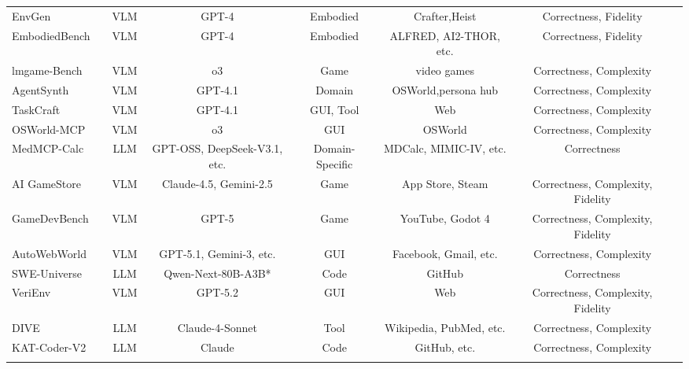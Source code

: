 \documentclass{llmxive}
\providecommand{\Text}{
  \begin{tikzpicture}[baseline=(char.base)]
    \fill[textgreen!50] (0,0) circle (0.18);
    \node[white, font=\scriptsize\rmfamily, inner sep=0pt] (char) at (0,0) {T};
  \end{tikzpicture}
}
\providecommand{\Image}{
  \begin{tikzpicture}[baseline=(char.base)]
    \fill[textred!50] (0,0) circle (0.18);
    \node[white, font=\scriptsize\rmfamily, inner sep=0pt] (char) at (0,0) {I};
  \end{tikzpicture}
}
\providecommand{\Video}{
  \begin{tikzpicture}[baseline=(char.base)]
    \fill[textyellow!50] (0,0) circle (0.18);
    \node[white, font=\scriptsize\rmfamily, inner sep=0pt] (char) at (0,0) {V};
  \end{tikzpicture}
}
\begin{document}
\begin{table}[htbp]
{\begin{tabular}{lccccccc}
 EnvGen\cite{EnvGen} & \Text\hspace{-0.4em}\Image & VLM & GPT-4 & Embodied & Crafter,Heist & Correctness, Fidelity \\
 EmbodiedBench\cite{EmbodiedBench} & \Text\hspace{-0.4em}\Image & VLM & GPT-4 & Embodied & ALFRED, AI2-THOR, etc. & Correctness, Fidelity \\
 lmgame-Bench\cite{LMGAME-BENCH} & \Text\hspace{-0.4em}\Image & VLM & o3 & Game & video games & Correctness, Complexity \\
 AgentSynth\cite{AgentSynth} &\Text\hspace{-0.4em}\Image & VLM & GPT-4.1 & Domain & OSWorld,persona hub & Correctness, Complexity \\
 TaskCraft\cite{TaskCraft} & \Text\hspace{-0.4em}\Image & VLM & GPT-4.1 & GUI, Tool & Web & Correctness, Complexity \\
 OSWorld-MCP\cite{OSWorld-MCP} & \Text\hspace{-0.4em}\Image & VLM & o3 & GUI & OSWorld & Correctness, Complexity \\
 MedMCP-Calc\cite{MedMCP-Calc} & \Text & LLM & GPT-OSS, DeepSeek-V3.1, etc. & Domain-Specific & MDCalc, MIMIC-IV, etc. & Correctness \\
 AI GameStore\cite{AI_GAMESTORE} & \Text\hspace{-0.4em}\Image & VLM & Claude-4.5, Gemini-2.5 & Game & App Store, Steam & Correctness, Complexity, Fidelity \\
 GameDevBench\cite{GameDevBench} & \Text\hspace{-0.4em}\Image\hspace{-0.4em}\Video & VLM & GPT-5 & Game & YouTube, Godot 4 & Correctness, Complexity, Fidelity \\
 AutoWebWorld\cite{AutoWebWorld} & \Text\hspace{-0.4em}\Image & VLM & GPT-5.1, Gemini-3, etc. & GUI & Facebook, Gmail, etc. & Correctness, Complexity \\
 SWE-Universe\cite{SWE-Universe} & \Text & LLM & Qwen-Next-80B-A3B* & Code & GitHub & Correctness \\
 VeriEnv\cite{VeriEnv} & \Text\hspace{-0.4em}\Image  & VLM & GPT-5.2 & GUI & Web & Correctness, Complexity, Fidelity \\
 DIVE\cite{DIVE} & \Text  & LLM & Claude-4-Sonnet & Tool & Wikipedia, PubMed, etc. & Correctness, Complexity \\
 KAT-Coder-V2\cite{KAT-Coder-V2} & \Text  & LLM & Claude & Code & GitHub, etc. & Correctness, Complexity \\
 \midrule
\rowcolor{gray!10!white} \multicolumn{7}{c}{\textbf{\textit{De Novo Synthesis (\cref{sec:synthesis from scratch})}}}\\ 


\end{tabular}}
\end{table}
\end{document}
